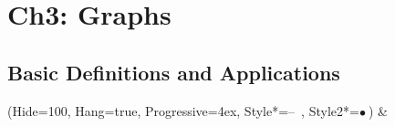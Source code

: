 \documentclass[11pt, oneside]{article}
\begin{document}
\section{Ch3: Graphs}
\subsection{Basic Definitions and Applications}
    \begin{easylist}  
    \ListProperties(Hide=100, Hang=true, Progressive=4ex, Style*=--\ , Style2*=$\bullet\ $)
        &
    \end{easylist}
\clearpage
\end{document}
